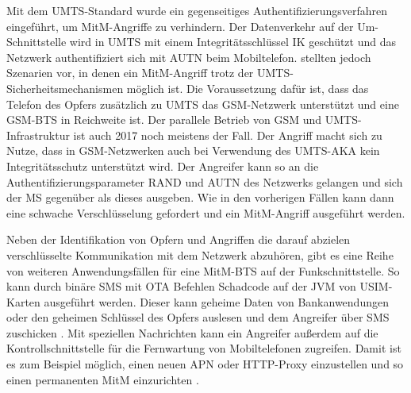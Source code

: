 Mit dem \ac{UMTS}-Standard wurde ein gegenseitiges Authentifizierungsverfahren eingeführt, um \ac{MitM}-Angriffe zu verhindern. Der Datenverkehr auf der \ac{Um}-Schnittstelle wird in \ac{UMTS} mit einem Integritätsschlüssel \ac{IK} geschützt und das Netzwerk authentifiziert sich mit \ac{AUTN} beim Mobiltelefon. \citet{meyer2004man} stellten jedoch Szenarien vor, in denen ein \ac{MitM}-Angriff trotz der \ac{UMTS}-Sicherheitsmechanismen möglich ist. Die Voraussetzung dafür ist, dass das Telefon des Opfers zusätzlich zu \ac{UMTS} das \ac{GSM}-Netzwerk unterstützt und eine \ac{GSM}-\ac{BTS} in Reichweite ist. Der parallele Betrieb von \ac{GSM} und \ac{UMTS}-Infrastruktur ist auch 2017 noch meistens der Fall. Der Angriff macht sich zu Nutze, dass in \ac{GSM}-Netzwerken auch bei Verwendung des \ac{UMTS}-\ac{AKA} kein Integritätsschutz unterstützt wird. Der Angreifer kann so an die Authentifizierungsparameter \ac{RAND} und \ac{AUTN} des Netzwerks gelangen und sich der \ac{MS} gegenüber als dieses ausgeben. Wie in den vorherigen Fällen kann dann eine schwache Verschlüsselung gefordert und ein \ac{MitM}-Angriff ausgeführt werden.

Neben der Identifikation von Opfern und Angriffen die darauf abzielen verschlüsselte Kommunikation mit dem Netzwerk abzuhören, gibt es eine Reihe von weiteren Anwendungsfällen für eine \ac{MitM}-\ac{BTS} auf der Funkschnittstelle. So kann durch binäre \ac{SMS} mit \ac{OTA} Befehlen Schadcode auf der \ac{JVM} von \ac{USIM}-Karten ausgeführt werden. Dieser kann geheime Daten von Bankanwendungen oder den geheimen Schlüssel des Opfers auslesen und dem Angreifer über \ac{SMS} zuschicken \citep{nohl2013rooting}. Mit speziellen Nachrichten kann ein Angreifer außerdem auf die Kontrollschnittstelle für die Fernwartung von Mobiltelefonen zugreifen. Damit ist es zum Beispiel möglich, einen neuen \ac{APN} oder \ac{HTTP}-Proxy einzustellen und so einen permanenten \ac{MitM} einzurichten \citep{solnik2014cellular}.

